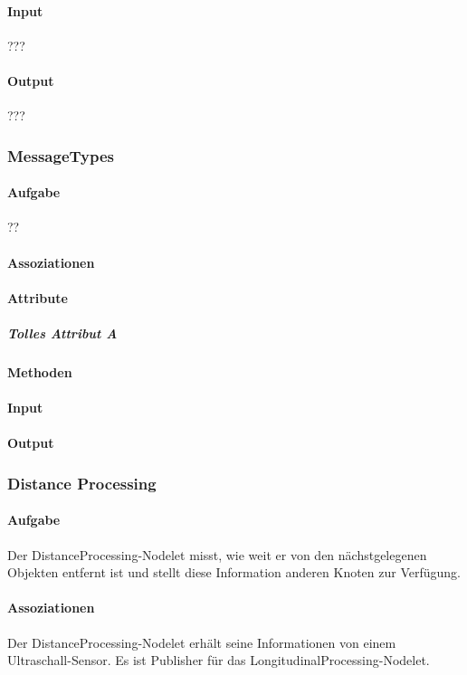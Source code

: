 \documentclass[a4paper, 12pt, titlepage]{scrartcl}
\begin{document}
				\paragraph{Input} ???
				\paragraph{Output} ???

			\subsubsection{MessageTypes}
			\label{messages_types}
				\paragraph{Aufgabe} ??
				\paragraph{Assoziationen}
				\paragraph{Attribute}
					\subparagraph{Tolles Attribut A}
				\paragraph{Methoden}

				\paragraph{Input}
				\paragraph{Output}

			\subsubsection{Distance Processing}
			\label{distance_processing}
				\paragraph{Aufgabe} Der DistanceProcessing-Nodelet misst, wie weit er von den nächstgelegenen Objekten entfernt ist und stellt diese Information anderen Knoten zur Verfügung. 
				\paragraph{Assoziationen} Der DistanceProcessing-Nodelet erhält seine Informationen von einem Ultraschall-Sensor. Es ist Publisher für das LongitudinalProcessing-Nodelet.
\end{document}
